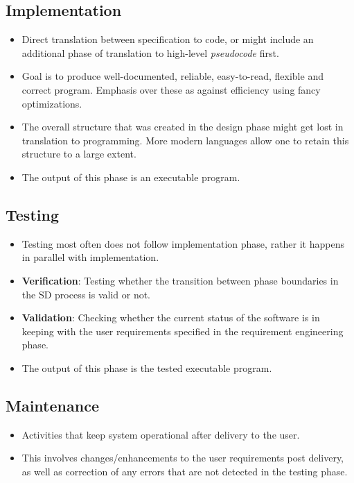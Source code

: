 \documentclass{article}
\begin{document}
\subsection{Implementation}
\begin{itemize}
    \item Direct translation between specification to code, or might include an additional phase of translation to high-level \textit{pseudocode} first.
    
    \item Goal is to produce well-documented, reliable, easy-to-read, flexible and correct program. Emphasis over these as against efficiency using fancy optimizations.
    
    \item The overall structure that was created in the design phase might get lost in translation to programming. More modern languages allow one to retain this structure to a large extent. 
    
    \item The output of this phase is an executable program. 
\end{itemize}

\subsection{Testing}
\begin{itemize}
    \item Testing most often does not follow implementation phase, rather it happens in parallel with implementation. 
    
    \item \textbf{Verification}: Testing whether the transition between phase boundaries in the SD process is valid or not.
    
    \item \textbf{Validation}: Checking whether the current status of the software is in keeping with the user requirements specified in the requirement engineering phase. 
    
    \item The output of this phase is the tested executable program. 
\end{itemize}

\subsection{Maintenance}
\begin{itemize}
    \item Activities that keep system operational after delivery to the user. 
    
    \item This involves changes/enhancements to the user requirements post delivery, as well as correction of any errors that are not detected in the testing phase. 
\end{itemize}
\end{document}
